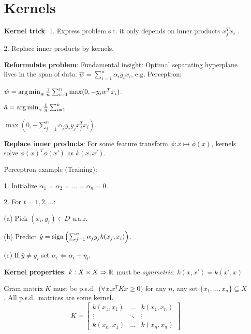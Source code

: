 \section{Kernels}
\textbf{Kernel trick}: 1. Express problem s.t. it only depends on inner products $x_j^T x_i$ .

2. Replace inner products by kernels.

\textbf{Reformulate problem}: 
Fundamental insight: Optimal separating hyperplane lives in the span of data: $\hat{w} = \sum_{i=1}^n \alpha_i y_i x_i$, e.g. Perceptron:

$\hat{w} = \operatorname*{arg\,min}_w \frac{1}{n} \sum_{i=1}^n \max(0, -y_i w^T x_i)$.

$\hat{a} = \operatorname*{arg\,min}_\alpha \frac{1}{n} \sum_{i=1}^n$

$\max(0,-\sum_{j=1}^n \alpha_j y_i y_j x_j^T x_i)$.

\textbf{Replace inner products}: For some feature transform $\phi: x \mapsto \phi(x)$, kernels solve $\phi(x)^T \phi(x')$  as $k(x, x')$.

Perceptron example (Training):

1. Initialize $\alpha_1 = \alpha_2 = \dots = \alpha_n = 0$.

2. For $t = 1, 2, \dots$:

(a) Pick $(x_i, y_i) \in D$ u.a.r.

(b) Predict $\hat{y} = \operatorname*{sign}\left(\sum_{j=1}^n \alpha_j y_j k(x_j, x_i)\right)$.

(c) If $\hat{y} \neq y_i$ set $\alpha_i \Leftarrow \alpha_i + \eta_t$.

\textbf{Kernel properties}: $k: X \times X \Rightarrow \mathbb{R}$ must be \emph{symmetric}: $k(x, x') = k(x', x)$

Gram matrix $K$ must be p.s.d.\ ($\forall x . x^T K x \geq 0)$ for any $n$, any
set $\{x_1, \dots, x_n\} \subseteq X$. All p.s.d.\ matrices are some kernel.
\[
    K = \begin{bmatrix}k(x_1,x_1) & \dots & k(x_1, x_n) \\ \vdots & \ddots &
    \vdots \\ k(x_n, x_1) & \dots & k(x_n, x_n)\end{bmatrix}
\]

